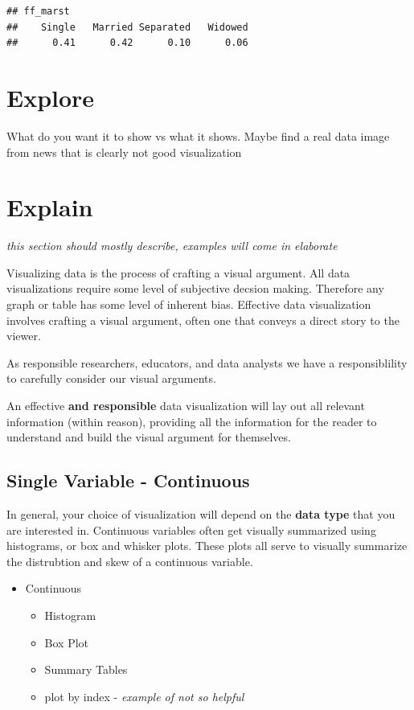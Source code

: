 \documentclass[
]{book}
\providecommand{\tightlist}{%
  \setlength{\itemsep}{0pt}\setlength{\parskip}{0pt}}
\begin{document}
\begin{verbatim}
## ff_marst
##    Single   Married Separated   Widowed 
##      0.41      0.42      0.10      0.06
\end{verbatim}

\hypertarget{explore-1}{%
\section{Explore}\label{explore-1}}

What do you want it to show vs what it shows. Maybe find a real data image from news that is clearly not good visualization

\hypertarget{explain-1}{%
\section{Explain}\label{explain-1}}

\emph{this section should mostly describe, examples will come in elaborate}

Visualizing data is the process of crafting a visual argument. All data visualizations require some level of subjective decsion making. Therefore any graph or table has some level of inherent bias. Effective data visualization involves crafting a visual argument, often one that conveys a direct story to the viewer.

As responsible researchers, educators, and data analysts we have a responsiblility to carefully consider our visual arguments.

An effective \textbf{and responsible} data visualization will lay out all relevant information (within reason), providing all the information for the reader to understand and build the visual argument for themselves.

\hypertarget{single-variable---continuous}{%
\subsection{Single Variable - Continuous}\label{single-variable---continuous}}

In general, your choice of visualization will depend on the \textbf{data type} that you are interested in. Continuous variables often get visually summarized using histograms, or box and whisker plots. These plots all serve to visually summarize the distrubtion and skew of a continuous variable.

\begin{itemize}
\tightlist
\item
  Continuous

  \begin{itemize}
  \tightlist
  \item
    Histogram
  \item
    Box Plot
  \item
    Summary Tables
  \item
    plot by index - \emph{example of not so helpful}
  \end{itemize}
\end{itemize}
\end{document}
